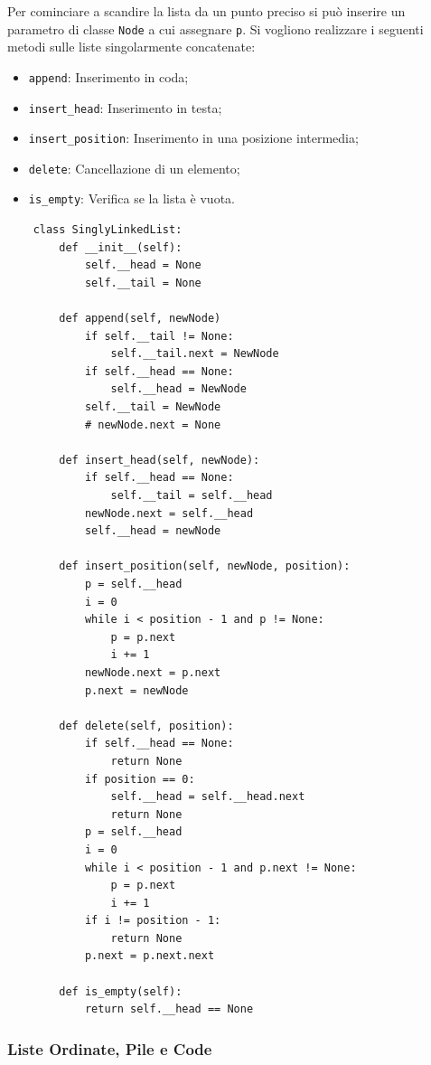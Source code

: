 \documentclass{article}
\numberwithin{equation}{subsection}
\begin{document}
Per cominciare a scandire la lista da un punto preciso si può inserire un parametro di classe \verb|Node| a cui 
assegnare \verb|p|. Si vogliono realizzare i seguenti metodi sulle liste singolarmente concatenate:
\begin{itemize}
    \item \verb|append|: Inserimento in coda;
    \item \verb|insert_head|: Inserimento in testa;
    \item \verb|insert_position|: Inserimento in una posizione intermedia;
    \item \verb|delete|: Cancellazione di un elemento;
    \item \verb|is_empty|: Verifica se la lista è vuota. 
\end{itemize}

\begin{verbatim}
    class SinglyLinkedList:
        def __init__(self):
            self.__head = None
            self.__tail = None

        def append(self, newNode)
            if self.__tail != None:
                self.__tail.next = NewNode
            if self.__head == None:
                self.__head = NewNode
            self.__tail = NewNode
            # newNode.next = None

        def insert_head(self, newNode):
            if self.__head == None:
                self.__tail = self.__head
            newNode.next = self.__head
            self.__head = newNode

        def insert_position(self, newNode, position):
            p = self.__head
            i = 0
            while i < position - 1 and p != None:
                p = p.next
                i += 1
            newNode.next = p.next
            p.next = newNode

        def delete(self, position):
            if self.__head == None:
                return None
            if position == 0:
                self.__head = self.__head.next
                return None
            p = self.__head
            i = 0
            while i < position - 1 and p.next != None:
                p = p.next
                i += 1
            if i != position - 1:
                return None
            p.next = p.next.next
            
        def is_empty(self):
            return self.__head == None
\end{verbatim}

\subsubsection{Liste Ordinate, Pile e Code}
\label{sec:lista_ordinata}
\end{document}
